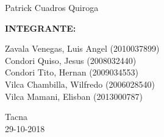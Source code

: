 \documentclass[12pt,letterpaper]{article}
\begin{document}
\begin{titlepage}
\begin{center}
\vspace*{0.1in}
\begin{large}
 Patrick Cuadros Quiroga\\
\end{large}

\vspace*{0.4in}
\vspace*{0.1in}
\begin{large}
\textbf{INTEGRANTE:} \\
\begin{flushleft}
Zavala Venegas, Luis Angel	\hfill	(2010037899)\\
Condori Quiso, Jesus		\hfill	(2008032440)\\
Condori Tito, Hernan		\hfill	(2009034553)\\
Vilca Chambilla, Wilfredo		\hfill	(2006028540)\\
Vilca Mamani, Elisban		\hfill	(2013000787)

\centering  %
\vspace*{0.9in}
\begin{large}
Tacna\\ 29-10-2018
\end{large}


\end{flushleft}
\end{large}
\end{center}

\end{titlepage}


\tableofcontents %
\thispagestyle{empty} %
\newpage
\setcounter{page}{1} %






\end{document}
